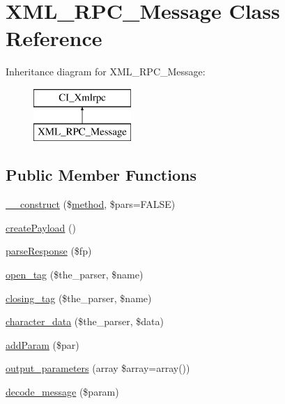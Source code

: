 \hypertarget{class_x_m_l___r_p_c___message}{}\section{X\+M\+L\+\_\+\+R\+P\+C\+\_\+\+Message Class Reference}
\label{class_x_m_l___r_p_c___message}
Inheritance diagram for X\+M\+L\+\_\+\+R\+P\+C\+\_\+\+Message\+:\begin{figure}[H]
\begin{center}
\leavevmode
\includegraphics[height=2.000000cm]{class_x_m_l___r_p_c___message}
\end{center}
\end{figure}
\subsection*{Public Member Functions}
\begin{DoxyCompactItemize}
\item 
\mbox{\hyperlink{class_x_m_l___r_p_c___message_a099ea001f597681d3e5d9004923ccbcf}{\+\_\+\+\_\+construct}} (\$\mbox{\hyperlink{class_c_i___xmlrpc_a3d7e090549ec52eba8cf65598eefa72c}{method}}, \$pars=F\+A\+L\+SE)
\item 
\mbox{\hyperlink{class_x_m_l___r_p_c___message_a9db0a53d149ebbb907ef60a27bbc9f1c}{create\+Payload}} ()
\item 
\mbox{\hyperlink{class_x_m_l___r_p_c___message_ab1b93386615fce804baf236bf660a646}{parse\+Response}} (\$fp)
\item 
\mbox{\hyperlink{class_x_m_l___r_p_c___message_a7709ec5b6f0e3769592f8afdc23b9169}{open\+\_\+tag}} (\$the\+\_\+parser, \$name)
\item 
\mbox{\hyperlink{class_x_m_l___r_p_c___message_a6f0fbd9812fbf30516fa22d5743d9e89}{closing\+\_\+tag}} (\$the\+\_\+parser, \$name)
\item 
\mbox{\hyperlink{class_x_m_l___r_p_c___message_ae10d173fc93c23cb233ff01acb2afbe2}{character\+\_\+data}} (\$the\+\_\+parser, \$data)
\item 
\mbox{\hyperlink{class_x_m_l___r_p_c___message_a8000e3ae75e90052e5ee10febb9ce2d0}{add\+Param}} (\$par)
\item 
\mbox{\hyperlink{class_x_m_l___r_p_c___message_a763d97af7e5ff17493db7ecbd1064ba9}{output\+\_\+parameters}} (array \$array=array())
\item 
\mbox{\hyperlink{class_x_m_l___r_p_c___message_a76c958448d4b6569bfab9bfd2fb3dff0}{decode\+\_\+message}} (\$param)
\end{DoxyCompactItemize}
